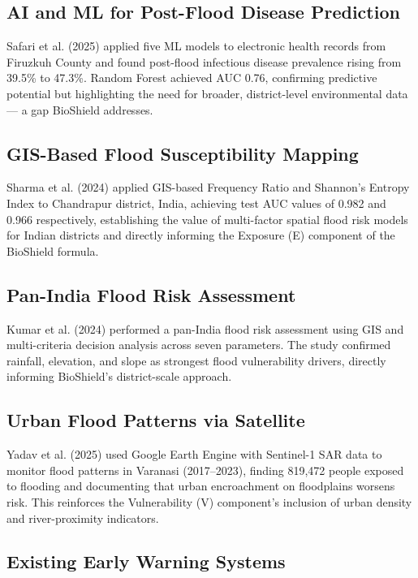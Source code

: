 \documentclass[12pt,a4paper]{report}
\begin{document}
\subsection{AI and ML for Post-Flood Disease Prediction}

Safari et al. (2025) applied five ML models to electronic health records from Firuzkuh County and found post-flood infectious disease prevalence rising from 39.5\% to 47.3\%. Random Forest achieved AUC 0.76, confirming predictive potential but highlighting the need for broader, district-level environmental data --- a gap BioShield addresses.

\subsection{GIS-Based Flood Susceptibility Mapping}

Sharma et al. (2024) applied GIS-based Frequency Ratio and Shannon's Entropy Index to Chandrapur district, India, achieving test AUC values of 0.982 and 0.966 respectively, establishing the value of multi-factor spatial flood risk models for Indian districts and directly informing the Exposure (E) component of the BioShield formula.

\subsection{Pan-India Flood Risk Assessment}

Kumar et al. (2024) performed a pan-India flood risk assessment using GIS and multi-criteria decision analysis across seven parameters. The study confirmed rainfall, elevation, and slope as strongest flood vulnerability drivers, directly informing BioShield's district-scale approach.

\subsection{Urban Flood Patterns via Satellite}

Yadav et al. (2025) used Google Earth Engine with Sentinel-1 SAR data to monitor flood patterns in Varanasi (2017--2023), finding 819,472 people exposed to flooding and documenting that urban encroachment on floodplains worsens risk. This reinforces the Vulnerability (V) component's inclusion of urban density and river-proximity indicators.

\subsection{Existing Early Warning Systems}
\end{document}
